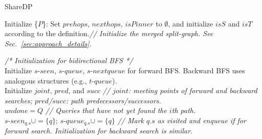 \begin{algorithm}[H]
    \caption{ShareDP}
    \label{alg:shareDP}
    
    Initialize \{$P$\}: Set $prehops$, $nexthops$, $isPinner$ to $\emptyset$, and initialize $isS$ and $isT$ according to the definition.\textit{\color{gray}// Initialize the merged split-graph. See Sec.~\ref{sec:approach_details}.} \\
    {
        \textit{\color{blue}/* Initialization for bidirectional BFS */} \\
        Initialize $s$-$seen$, $s$-$queue$, $s$-$nextqueue$ for forward BFS. Backward BFS uses analogous structures (e.g., $t$-$queue$). \\
        Initialize $joint$, $pred$, and $succ$ \textit{\color{gray}// $joint$: meeting points of forward and backward searches; $pred$/$succ$: path predecessors/successors.} \\
        $undone = Q$ \textit{\color{gray}// Queries that have not yet found the $i$th path.} \\
        
        {
            $s$-$seen_{q.s} \cup= \{q\}$; $s$-$queue_{q.s} \cup= \{q\}$ \textit{\color{gray}// Mark $q.s$ as visited and enqueue if for forward search. Initialization for backward search is similar.} \\
        }

}
\end{algorithm}

